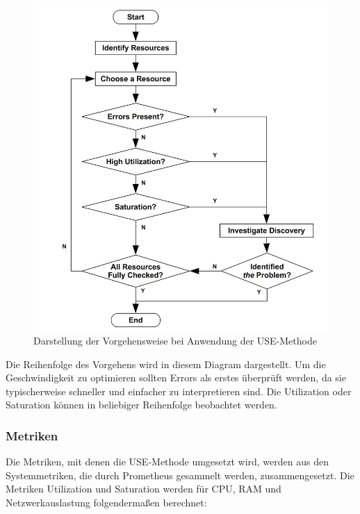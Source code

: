 \documentclass[a4paper,10pt]{scrartcl}
\begin{document}
\begin{figure}[htbp]
\includegraphics[scale=.7]{img/usemethod_flow.png}
\caption{Darstellung der Vorgehensweise bei Anwendung der USE-Methode ~\protect\cite{.20200810T18:06:18.000Z}}
\end{figure}

Die Reihenfolge des Vorgehens wird in diesem Diagram dargestellt. Um die Geschwindigkeit zu optimieren sollten Errors als erstes überprüft werden, da sie typischerweise schneller und einfacher zu interpretieren sind. Die Utilization oder Saturation können in beliebiger Reihenfolge beobachtet werden.
\cite{.27.07.2020}

\pagebreak

\subsubsection{Metriken}

Die Metriken, mit denen die USE-Methode umgesetzt wird, werden aus den Systemmetriken, die durch Prometheus gesammelt werden, zusammengesetzt. 
Die Metriken Utilization und Saturation werden für CPU, RAM und Netzwerkauslastung folgendermaßen berechnet:
\end{document}
